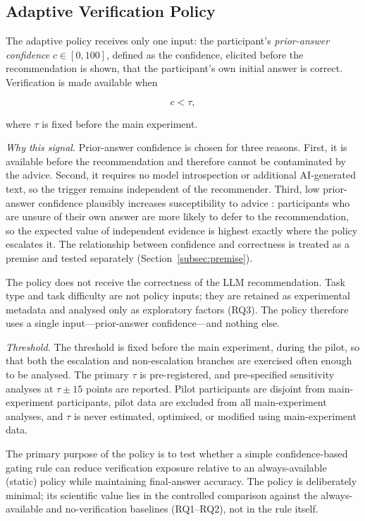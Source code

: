 \documentclass[oneside,final,14pt,a4paper]{extreport}
\begin{document}
\subsection{Adaptive Verification Policy}
\label{subsec:policy}

The adaptive policy receives only one input: the participant's
\emph{prior-answer confidence} $c\in[0,100]$, defined as the confidence,
elicited before the recommendation is shown, that the participant's own
initial answer is correct. Verification is made available when

\[
c < \tau,
\]

where $\tau$ is fixed before the main experiment.

\emph{Why this signal.} Prior-answer confidence is chosen for three reasons.
First, it is available before the recommendation and therefore cannot be
contaminated by the advice. Second, it requires no model introspection or
additional AI-generated text, so the trigger remains independent of the
recommender. Third, low prior-answer confidence plausibly increases
susceptibility to advice \cite{YanivKleinberger2000}: participants who are unsure of their
own answer are more likely to defer to the recommendation, so the expected
value of independent evidence is highest exactly where the policy escalates
it. The relationship between confidence and correctness is treated as a
premise and tested separately (Section~\ref{subsec:premise}).

The policy does not receive the correctness of the LLM recommendation. Task
type and task difficulty are not policy inputs; they are retained as
experimental metadata and analysed only as exploratory factors (RQ3). The
policy therefore uses a single input---prior-answer confidence---and nothing
else.

\emph{Threshold.} The threshold is fixed before the main experiment, during
the pilot, so that both the escalation and non-escalation branches are
exercised often enough to be analysed. The
primary $\tau$ is pre-registered, and pre-specified sensitivity analyses at
$\tau\pm15$ points are reported. Pilot participants are disjoint from
main-experiment participants, pilot data are excluded from all main-experiment
analyses, and $\tau$ is never estimated, optimised, or modified using
main-experiment data.

The primary purpose of the policy is to test whether a simple
confidence-based gating rule can reduce verification exposure relative to
an always-available (static) policy while maintaining final-answer accuracy.
The policy is deliberately minimal; its scientific value lies in the
controlled comparison against the always-available and no-verification
baselines (RQ1--RQ2), not in the rule itself.
\end{document}
